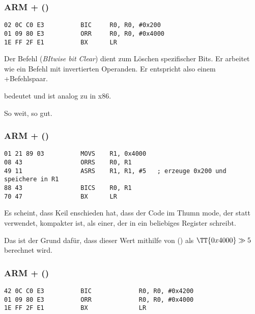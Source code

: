 \subsubsection{ARM + \OptimizingKeilVI (\ARMMode)}

\begin{lstlisting}[caption=\OptimizingKeilVI (\ARMMode),style=customasmARM]
02 0C C0 E3          BIC     R0, R0, #0x200
01 09 80 E3          ORR     R0, R0, #0x4000
1E FF 2F E1          BX      LR
\end{lstlisting}

Der Befehl  (\emph{BItwise bit Clear}) dient zum Löschen spezifischer
Bits. Er arbeitet wie ein \AND Befehl mit invertierten Operanden. Er entspricht
also einem \NOT+\AND Befehlspaar.

 bedeutet  und ist analog zu \OR in x86.

So weit, so gut.

\subsubsection{ARM + \OptimizingKeilVI (\ThumbMode)}

\begin{lstlisting}[caption=\OptimizingKeilVI (\ThumbMode),style=customasmARM]
01 21 89 03          MOVS    R1, 0x4000
08 43                ORRS    R0, R1
49 11                ASRS    R1, R1, #5   ; erzeuge 0x200 und speichere in R1
88 43                BICS    R0, R1
70 47                BX      LR
\end{lstlisting}
Es scheint, dass Keil enschieden hat, dass der Code im Thumn mode, der
 statt  verwendet, kompakter ist, als einer, der 
in ein beliebiges Register schreibt.


Das ist der Grund dafür, dass dieser Wert mithilfe von  (\ASRdesc) als
$\TT{0x4000} \gg 5$ berechnet wird.

\subsubsection{ARM + \OptimizingXcodeIV (\ARMMode)}
\label{anomaly:LLVM}
\myindex{\CompilerAnomaly}

\begin{lstlisting}[caption=\OptimizingXcodeIV (\ARMMode),label=ARM_leaf_example3,style=customasmARM]
42 0C C0 E3          BIC             R0, R0, #0x4200
01 09 80 E3          ORR             R0, R0, #0x4000
1E FF 2F E1          BX              LR
\end{lstlisting}

